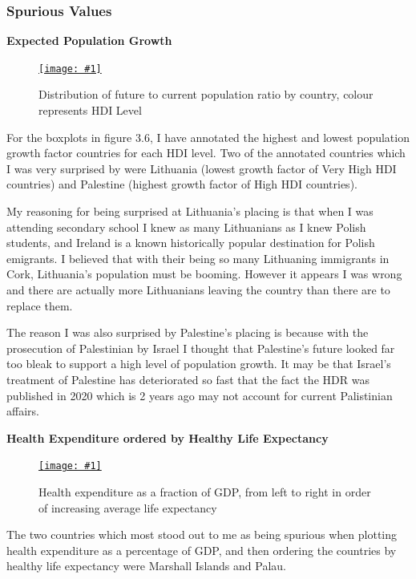 \documentclass[11pt,a4paper,final]{article}
\newcommand\onlinefig[3]{
\begin{figure}[H]
  \centering
  \href{#3}{\texttt{[image: \#1]}}
  \caption{#2} 
  \label{fig:#1}
\end{figure}
}
\begin{document}
\begin{multicols}{2}
\subsubsection{Spurious Values}
\begin{flushleft}
\textbf{Expected Population Growth}
\end{flushleft}
\onlinefig{population_growth_ratio_boxplot}{Distribution of future to current population ratio by country, colour represents HDI Level}{https://public.tableau.com/views/CS3205-HDI/Sheet11?:language=en-GB&:display_count=n&:origin=viz_share_link}

For the boxplots in figure 3.6, I have annotated the highest and lowest population growth factor countries for each HDI level. Two of the annotated countries which I was very surprised by were Lithuania (lowest growth factor of Very High HDI countries) and Palestine (highest growth factor of High HDI countries).

My reasoning for being surprised at Lithuania's placing is that when I was attending secondary school I knew as many Lithuanians as I knew Polish students, and Ireland is a known historically popular destination for Polish emigrants. I believed that with their being so many Lithuaning immigrants in Cork, Lithuania's population must be booming. However it appears I was wrong and there are actually more Lithuanians leaving the country than there are to replace them.

The reason I was also surprised by Palestine's placing is because with the prosecution of Palestinian by Israel I thought that Palestine's future looked far too bleak to support a high level of population growth. It may be that Israel's treatment of Palestine has deteriorated so fast that the fact the HDR was published in 2020 which is 2 years ago may not account for current Palistinian affairs.
\columnbreak

\begin{flushleft}
\textbf{Health Expenditure ordered by Healthy Life Expectancy}
\end{flushleft}
\onlinefig{health_expenditure_ordered_by_life_expectancy}{Health expenditure as a fraction of GDP, from left to right in order of increasing average life expectancy}{https://public.tableau.com/views/CS3205-HDI/Sheet9?:language=en-GB&:display_count=n&:origin=viz_share_link}

The two countries which most stood out to me as being spurious when plotting health expenditure as a percentage of GDP, and then ordering the countries by healthy life expectancy were Marshall Islands and Palau.


\end{multicols}
\end{document}
